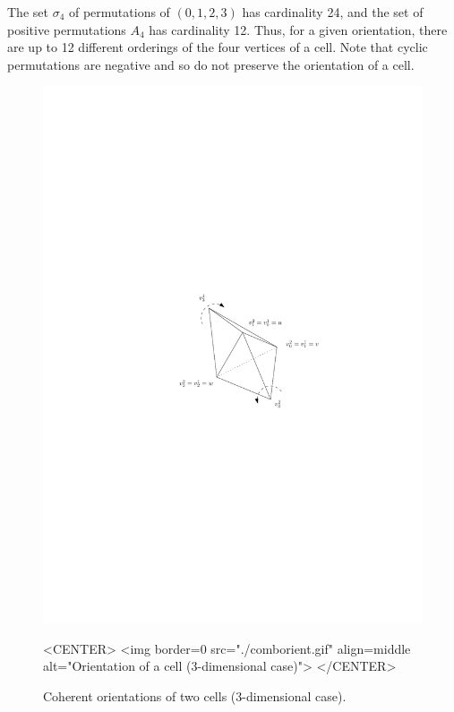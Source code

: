 The set {\Large $\sigma$}$_4$ of permutations of
$(0,1,2,3)$ has cardinality 24, and the set of positive permutations
$A_4$ has cardinality 12. Thus, for a given orientation, there
are up to 12 different orderings of the four vertices of a cell. Note
that cyclic permutations are negative and so do not preserve the
orientation of a cell.

\begin{figure}[htbp]
\begin{ccTexOnly}
\begin{center} 
\includegraphics{TriangulationDS_3/comborient} 
\end{center}
\end{ccTexOnly}
\begin{ccHtmlOnly}
<CENTER>
<img border=0 src="./comborient.gif" align=middle alt="Orientation of a cell (3-dimensional case)">
</CENTER>
\end{ccHtmlOnly}
\caption{Coherent orientations of two cells (3-dimensional case).
\label{TDS3-fig-comborient}}
\end{figure} 


